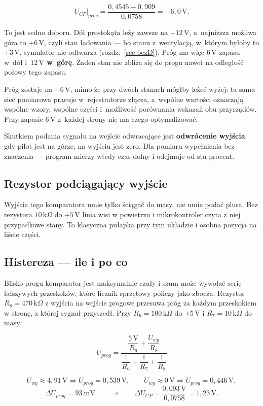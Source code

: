 \documentclass[a4paper,11pt]{article}
\newcommand{\kohm}{\,\mathrm{k}\Omega}
\newcommand{\volt}{\,\mathrm{V}}
\begin{document}
\[
U_{CP}\big|_{prog}=\frac{0{,}4545-0{,}909}{0{,}0758}=-6{,}0\volt .
\]

To jest sedno doboru. Dół prostokąta leży zawsze na $-12\volt$, a~najniższa możliwa
góra to $+6\volt$, czyli stan ładowania --- bo stanu z~wentylacją, w~którym byłoby to
$+3\volt$, symulator nie odtwarza (rozdz.~\ref{sec:bezD}). Próg ma więc $6\volt$
zapasu w~dół i~\textbf{$12\volt$ w~górę}. Żaden stan nie zbliża się do progu nawet
na odległość połowy tego zapasu.

Próg zostaje na $-6\volt$, mimo że przy dwóch stanach mógłby leżeć wyżej: ta sama
sieć pomiarowa pracuje w~rejestratorze złącza, a~wspólne wartości oznaczają wspólne
wzory, wspólne części i~możliwość porównania wskazań obu przyrządów. Przy zapasie
$6\volt$ z~każdej strony nie ma czego optymalizować.

Skutkiem podania sygnału na wejście odwracające jest \textbf{odwrócenie wyjścia}:
gdy pilot jest na górze, na wyjściu jest zero. Dla pomiaru wypełnienia bez
znaczenia --- program mierzy wtedy czas dolny i odejmuje od stu procent.

\subsection{Rezystor podciągający wyjście}

Wyjście tego komparatora umie tylko ściągać do masy, nie umie podać plusa. Bez
rezystora $10\kohm$ do $+5\volt$ linia wisi w powietrzu i mikrokontroler czyta z niej
przypadkowe stany. To klasyczna pułapka przy tym układzie i osobna pozycja na
liście części.

\subsection{Histereza --- ile i po co}

Blisko progu komparator jest maksymalnie czuły i szum może wywołać serię fałszywych
przeskoków, które licznik sprzętowy policzy jako zbocza. Rezystor $R_8=470\kohm$
z wyjścia na wejście progowe przesuwa próg za każdym przeskokiem w stronę, z której
sygnał przyszedł. Przy $R_6=100\kohm$ do $+5\volt$ i $R_7=10\kohm$ do masy:

\begin{equation}
U_{prog}=\frac{\dfrac{5\volt}{R_6}+\dfrac{U_{wy}}{R_8}}
              {\dfrac{1}{R_6}+\dfrac{1}{R_7}+\dfrac{1}{R_8}}
\label{eq:histereza}
\end{equation}

\[
U_{wy}\approx 4{,}91\volt \Rightarrow U_{prog}=0{,}539\volt,
\qquad
U_{wy}\approx 0\volt \Rightarrow U_{prog}=0{,}446\volt,
\]
\[
\Delta U_{prog}=93\ \mathrm{mV}
\qquad\Longrightarrow\qquad
\Delta U_{CP}=\frac{0{,}093\volt}{0{,}0758}=1{,}23\volt .
\]
\end{document}

